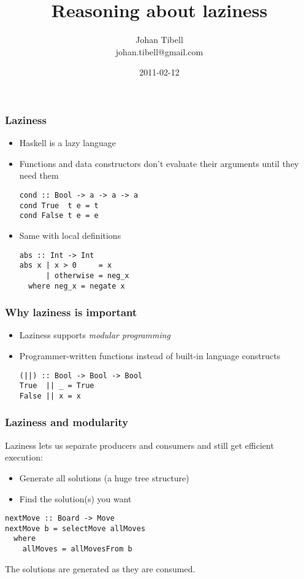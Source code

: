 \documentclass{beamer}
\title{Reasoning about laziness}
\author{Johan Tibell\\johan.tibell@gmail.com}
\date{2011-02-12}
\begin{document}
\lstset{language=Haskell}

\frame{\titlepage}

\begin{frame}[fragile]
  \frametitle{Laziness}

  \begin{itemize}
  \item Haskell is a lazy language
  \item Functions and data constructors don't evaluate their arguments
    until they need them
    \begin{lstlisting}
cond :: Bool -> a -> a -> a
cond True  t e = t
cond False t e = e
    \end{lstlisting}
  \item Same with local definitions
    \begin{lstlisting}
abs :: Int -> Int
abs x | x > 0     = x
      | otherwise = neg_x
  where neg_x = negate x
    \end{lstlisting}
  \end{itemize}
\end{frame}

\begin{frame}[fragile]
  \frametitle{Why laziness is important}

  \begin{itemize}
  \item Laziness supports \emph{modular programming}
  \item Programmer-written functions instead of built-in language
    constructs
    \begin{lstlisting}
(||) :: Bool -> Bool -> Bool
True  || _ = True
False || x = x
    \end{lstlisting}
  \end{itemize}
\end{frame}

\begin{frame}[fragile]
  \frametitle{Laziness and modularity}

  Laziness lets us separate producers and consumers and still get
  efficient execution:
  \begin{itemize}
  \item Generate all solutions (a huge tree structure)
  \item Find the solution(s) you want
  \end{itemize}

  \begin{lstlisting}
nextMove :: Board -> Move
nextMove b = selectMove allMoves
  where
    allMoves = allMovesFrom b
  \end{lstlisting}

  The solutions are generated as they are consumed.
\end{frame}
\end{document}
